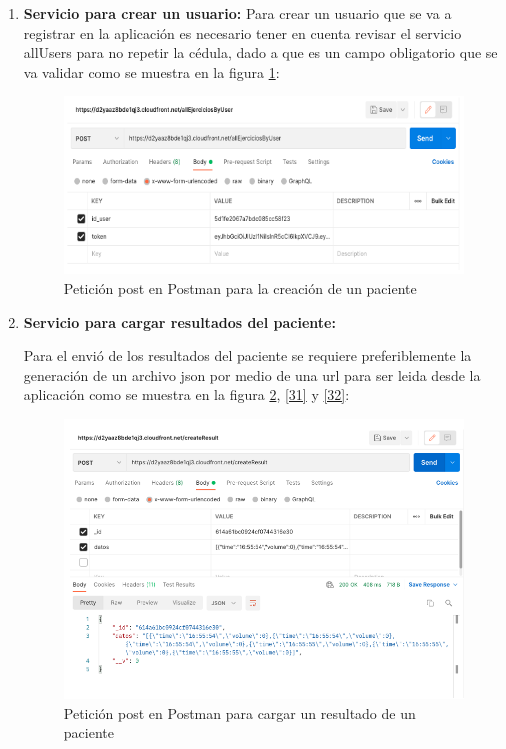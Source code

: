 \documentclass[12pt]{article}
\begin{document}
\begin{enumerate}
    \item \textbf{Servicio para crear un usuario:}
    Para crear un usuario que se va a registrar en la aplicación es necesario tener en cuenta revisar el servicio allUsers para no repetir la cédula, dado a que es un campo obligatorio que se va validar como se muestra en la figura \ref{29}: 
    
            \begin{figure}[ht]
            \centering
            \includegraphics[scale=0.5]{imag/presonline.png}
            \caption{Petición post en Postman para la creación de un paciente }
            \label{29}
            \end{figure}
            \FloatBarrier
    
    

            
    \item \textbf{Servicio para cargar resultados del paciente:}
    
    Para el envió de los resultados del paciente se requiere preferiblemente la generación de un archivo json por medio de una url para ser leida desde la aplicación como se muestra en la figura \ref{30}, \ref{31} y \ref{32}:
   
    
            \begin{figure}[ht]
            \centering
            \includegraphics[scale=0.35]{imag/createresultonline.png}
            \caption{Petición post en Postman para cargar un resultado de un paciente }
            \label{30}
            \end{figure}
            \FloatBarrier
            

\end{enumerate}
\end{document}
